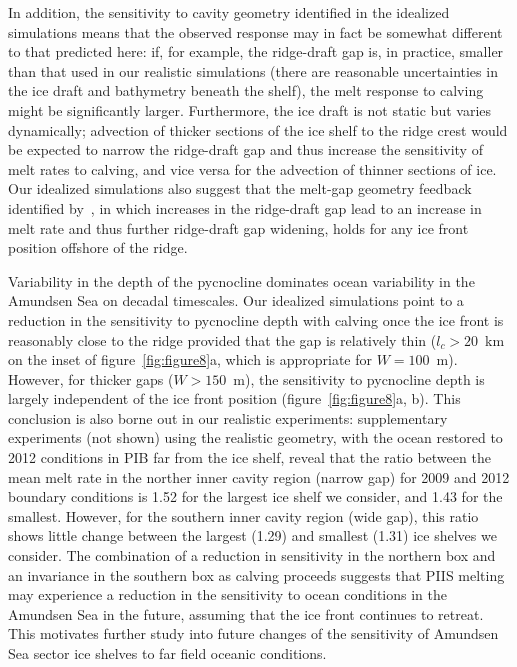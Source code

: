 \documentclass[draft]{agujournal2019}
\begin{document}
In addition, the sensitivity to cavity geometry identified in the idealized simulations means that the observed response may in fact be somewhat different to that predicted here: if, for example, the ridge-draft gap is, in practice, smaller than that used in our realistic simulations (there are reasonable uncertainties in the ice draft and bathymetry beneath the shelf), the melt response to calving might be significantly larger. Furthermore, the ice draft is not static but varies dynamically; advection of thicker sections of the ice shelf to the ridge crest would be expected to narrow the ridge-draft gap and thus increase the sensitivity of melt rates to calving, and vice versa for the advection of thinner sections of ice. Our idealized simulations also suggest that the melt-gap geometry feedback identified by~\cite{DeRydt2014JGeophysResOceans}, in which increases in the ridge-draft gap lead to an increase in melt rate and thus further ridge-draft gap widening, holds for any ice front position offshore of the ridge.

Variability in the depth of the pycnocline dominates ocean variability in the Amundsen Sea on decadal timescales. Our idealized simulations point to a reduction in the sensitivity to pycnocline depth with calving once the ice front is reasonably close to the ridge provided that the gap is relatively thin ($l_c > 20$~km on the inset of figure~\ref{fig:figure8}a, which is appropriate for $W=100$~m). However, for thicker gaps ($W > 150$~m), the sensitivity to pycnocline depth is largely independent of the ice front position (figure~\ref{fig:figure8}a, b). This conclusion is also borne out in our realistic experiments: supplementary experiments (not shown) using the realistic geometry, with the ocean restored to 2012 conditions in PIB far from the ice shelf, reveal that the ratio between the mean melt rate in the norther inner cavity region (narrow gap) for 2009 and 2012 boundary conditions is 1.52 for the largest ice shelf we consider, and 1.43 for the smallest. However, for the southern inner cavity region (wide gap), this ratio shows little change between the largest (1.29) and smallest (1.31) ice shelves we consider. The combination of a reduction in sensitivity in the northern box and an invariance in the southern box as calving proceeds suggests that PIIS melting may experience a reduction in the sensitivity to ocean conditions in the Amundsen Sea in the future, assuming that the ice front continues to retreat. This motivates further study into future changes of the sensitivity of Amundsen Sea sector ice shelves to far field oceanic conditions.
\end{document}

